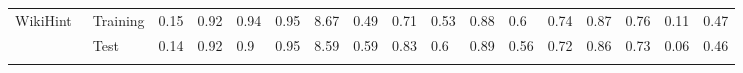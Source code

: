 \begin{table*}[t]
{\begin{tabular}{@{}ll|llll|llll|lll|ll|ll@{}}
\multirow{14}{*}{WikiHint~\cite{2024arXiv241201626M}} & Training             & 0.15                                                                    & 0.92                                                                     & 0.94                                                                  & 0.95                                                                  & 8.67                                                                    & 0.49                                                                  & 0.71                                                                  & 0.53                                                                   & 0.88                                                                    & 0.6                                                                   & 0.74                                                                   & 0.87                                                                   & 0.76                                                                   & 0.11                                                                     & 0.47                                                                     \\
                           & Test                 & 0.14                                                                    & 0.92                                                                     & 0.9                                                                   & 0.95                                                                  & 8.59                                                                    & 0.59                                                                  & 0.83                                                                  & 0.6                                                                    & 0.89                                                                    & 0.56                                                                  & 0.72                                                                   & 0.86                                                                   & 0.73                                                                   & 0.06                                                                     & 0.46                                                                     \\ \cmidrule{2-17}

\end{tabular}}
\end{table*}
